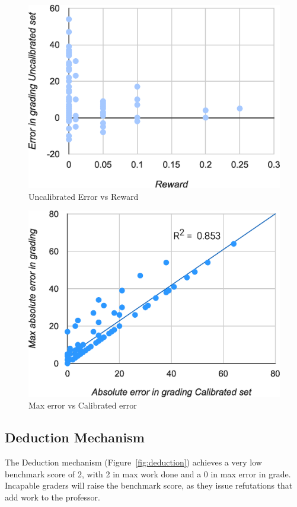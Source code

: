 \documentclass{sigchi}
\begin{document}
\begin{figure}[!h]
\centering
\includegraphics[width=0.9\columnwidth]{Reward-Error-Graph.eps}
\caption{Uncalibrated Error vs Reward}
\label{fig:reward-error}
\end{figure}

\begin{figure}[!h]
\centering
\includegraphics[width=0.9\columnwidth]{Error-Calibration-Graph.eps}
\caption{Max error vs Calibrated error}
\label{fig:error-calibration}
\end{figure}

\subsection{Deduction Mechanism}

The Deduction mechanism (Figure~\ref{fig:deduction}) achieves a very low benchmark score of 2, with 2 in max work done and a 0 in max error in grade. Incapable graders will raise the benchmark score, as they issue refutations that add work to the professor.
\end{document}
